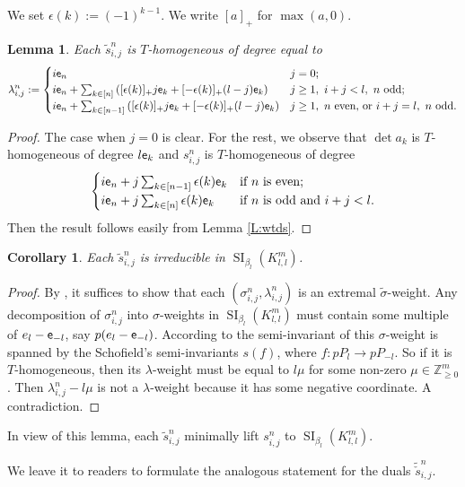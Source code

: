\documentclass{amsart}
\newtheorem{lemma}[theorem]{Lemma}
\newtheorem{corollary}[theorem]{Corollary}
\theoremstyle{definition}
\theoremstyle{remark}
\numberwithin{equation}{section}
\DeclareMathOperator{\SI}{SI}
\newcommand{\mb}[1]{\mathbb{#1}}
\newcommand{\wtd}[1]{\widetilde{#1}}
\newcommand{\e}{{\sf e}}
\newcommand{\kllm}{{K_{l,l}^m}}
\newcommand{\bl}{{\beta_l}}
\newcommand{\ijn}{_{i,j}^{n}}
\begin{document}
We set $\epsilon(k):=(-1)^{k-1}$. We write $[a]_+$ for $\max(a,0)$. 
\begin{lemma} \label{L:Tdegree} Each $\wtd{s}\ijn$ is $T$-homogeneous of degree equal to
	$$\lambda\ijn:= \begin{cases} 
	i\e_n & j=0;\\ 
	i\e_n+ \sum_{k\in [n]} \left([\epsilon(k)]_+j\e_k + [-\epsilon(k)]_+(l-j)\e_k \right) & j\geq 1,\ i+j<l,\ n \text{ odd};\\
	i\e_n+ \sum_{k\in [n-1]} \left([\epsilon(k)]_+j\e_k + [-\epsilon(k)]_+(l-j)\e_k \right) & j\geq 1,\ n \text{ even, or } i+j=l,\ n \text{ odd}.
	\end{cases}$$
\end{lemma}

\begin{proof} The case when $j=0$ is clear. For the rest,
	we observe that $\det a_k$ is $T$-homogeneous of degree $l\e_k$ and ${s}\ijn$ is $T$-homogeneous of degree
$$\begin{cases}
i\e_n + j\sum_{k\in [n-1]} \epsilon(k)\e_k &  \text{if $n$ is even};\\
i\e_n + j\sum_{k\in [n]} \epsilon(k)\e_k & \text{if $n$ is odd and $i+j< l$}.
\end{cases}$$
Then the result follows easily from Lemma \ref{L:wtds}.
\end{proof}


\begin{corollary} \label{C:irreducible} Each $\wtd{s}\ijn$ is irreducible in $\SI_\bl(\kllm)$.
\end{corollary}

\begin{proof} By \cite[Lemma 1.8]{Fs1}, it suffices to show that each $(\sigma\ijn,\lambda\ijn)$ is an extremal $\wtd{\sigma}$-weight.
Any decomposition of $\sigma\ijn$ into $\sigma$-weights in $\SI_\bl(\kllm)$ must contain some multiple of $e_{l}-\e_{-l}$, say $p(e_{l}-\e_{-l})$.
According to \cite{DW1,SV,DZ} the semi-invariant of this $\sigma$-weight is spanned by the Schofield's semi-invariants $s(f)$, where $f: p P_{l}\to p P_{-l}$.
So if it is $T$-homogeneous, then its $\lambda$-weight must be equal to $l\mu$ for some non-zero $\mu\in \mb{Z}_{\geq 0}^m$.
Then $\lambda\ijn - l\mu$ is not a $\lambda$-weight because it has some negative coordinate. A contradiction.
\end{proof}
\noindent In view of this lemma, each $\wtd{s}\ijn$ minimally lift ${s}\ijn$ to $\SI_\bl(\kllm)$.

We leave it to readers to formulate the analogous statement for the duals $\wtd{\check{s}}\ijn$.
\end{document}
